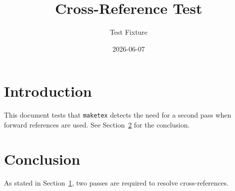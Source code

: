\documentclass{article}
\title{Cross-Reference Test}
\author{Test Fixture}
\date{2026-06-07}
\begin{document}
\maketitle

\section{Introduction}
\label{sec:intro}

This document tests that \texttt{maketex} detects the need for a second pass
when forward references are used. See Section~\ref{sec:conclusion} for the
conclusion.

\section{Conclusion}
\label{sec:conclusion}

As stated in Section~\ref{sec:intro}, two passes are required to resolve
cross-references.
\end{document}
